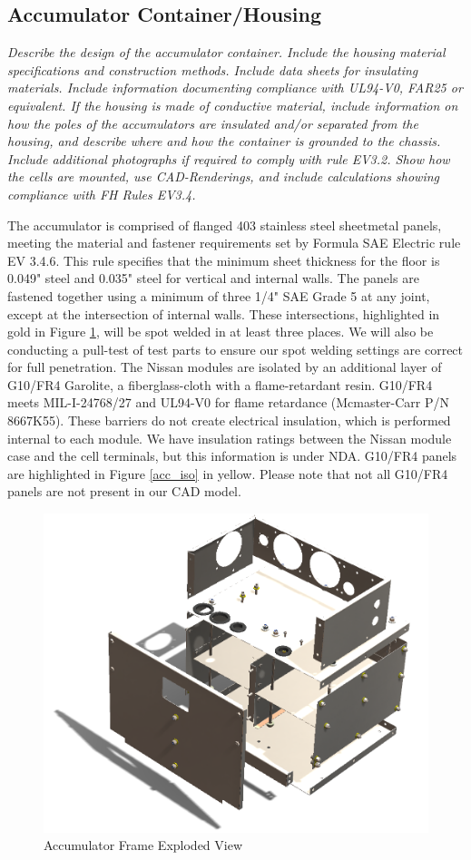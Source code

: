 \documentclass{article}
\begin{document}
\subsection{Accumulator Container/Housing}

\textit{Describe the design of the accumulator container. Include the housing material specifications and construction methods. Include data sheets for insulating materials.  Include information documenting compliance with UL94-V0, FAR25 or equivalent.
If the housing is made of conductive material, include information on how the poles of the accumulators are insulated and/or separated from the housing, and describe where and how the container is grounded to the chassis.
Include additional photographs if required to comply with rule EV3.2.
Show how the cells are mounted, use CAD-Renderings, and include calculations showing compliance with FH Rules EV3.4.}

The accumulator is comprised of flanged 403 stainless steel sheetmetal panels, meeting the material and fastener requirements set by Formula SAE Electric rule EV 3.4.6. This rule specifies that the minimum sheet thickness for the floor is 0.049" steel and 0.035" steel for vertical and internal walls. The panels are fastened together using a minimum of three 1/4" SAE Grade 5 at any joint, except at the intersection of internal walls. These intersections, highlighted in gold in Figure \ref{acc_frame}, will be spot welded in at least three places. We will also be conducting a pull-test of test parts to ensure our spot welding settings are correct for full penetration. The Nissan modules are isolated by an additional layer of G10/FR4 Garolite, a fiberglass-cloth with a flame-retardant resin. G10/FR4 meets MIL-I-24768/27 and UL94-V0 for flame retardance (Mcmaster-Carr P/N 8667K55). These barriers do not create electrical insulation, which is performed internal to each module. We have insulation ratings between the Nissan module case and the cell terminals, but this information is under NDA. G10/FR4 panels are highlighted in Figure \ref{acc_iso} in yellow. Please note that not all G10/FR4 panels are not present in our CAD model.

\begin{figure}[H]
    \centering
    \includegraphics[width = 0.7 \textwidth]{accumulator_frame}
    \caption{Accumulator Frame Exploded View}
    \label{acc_frame}
\end{figure}
\end{document}
